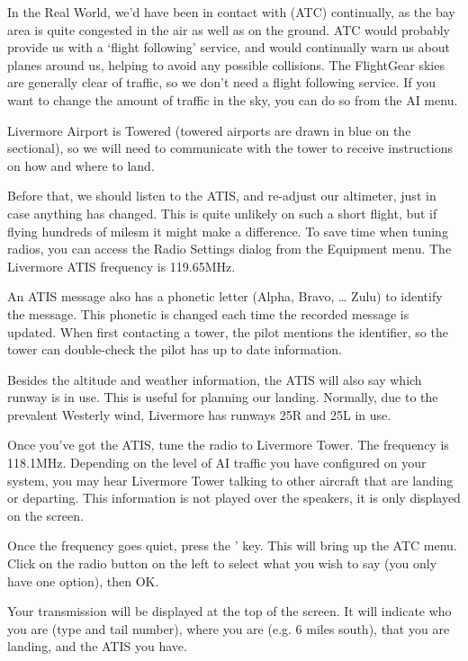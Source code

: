 In the Real World, we'd have been in contact with  (ATC) 
continually, as the bay area is quite congested in the air as well as on the ground. 
ATC would probably provide us with a `flight following' service, and would continually 
warn us about planes around us, helping to avoid any possible collisions. 
The FlightGear skies are generally clear of traffic, so we don't need a flight following service. 
If you want to change the amount of traffic in the sky, you can do so from the AI menu.

Livermore Airport is Towered (towered airports are drawn in blue on the sectional), 
so we will need to communicate with the tower to receive instructions on how and where to land.

Before that, we should listen to the ATIS, and re-adjust our altimeter, 
just in case anything has changed. This is quite unlikely on such a short flight, 
but if flying hundreds of milesm it might make a difference. To save time when tuning 
radios, you can access the Radio Settings dialog from the Equipment menu. 
The Livermore ATIS frequency is 119.65MHz.

An ATIS message also has a phonetic letter (Alpha, Bravo, \ldots{} Zulu) to identify 
the message. This phonetic is changed each time the recorded message is updated. 
When first contacting a tower, the pilot mentions the identifier, so the tower can 
double-check the pilot has up to date information.

Besides the altitude and weather information, the ATIS will also say which runway is in use. 
This is useful for planning our landing. Normally, due to the prevalent Westerly wind, 
Livermore has runways 25R and 25L in use. 

Once you've got the ATIS, tune the radio to Livermore Tower. The frequency is 118.1MHz. 
Depending on the level of AI traffic you have configured on your system, you may hear 
Livermore Tower talking to other aircraft that are landing or departing. 
This information is not played over the speakers, it is only displayed on the screen.

Once the frequency goes quiet, press the ' key. This will bring up the ATC menu. 
Click on the radio button on the left to select what you wish to say (you only have one option), then OK.

Your transmission will be displayed at the top of the screen. 
It will indicate who you are (type and tail number), where you are (e.g. 6 miles south), 
that you are landing, and the ATIS you have.

